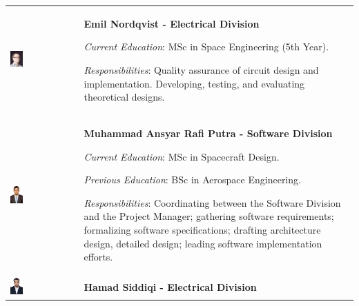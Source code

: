 \begin{longtable}[]{m{} m{}}
\includegraphics[width=0.2\textwidth]{1-introduction/img/emil-nordqvist.jpg} & \textbf{Emil Nordqvist - Electrical Division}

\smallskip
\textit{Current Education}: MSc in Space Engineering (5th Year).

\smallskip
\textit{Responsibilities}: Quality assurance of circuit design and implementation. Developing, testing, and evaluating theoretical designs.  \bigskip
\\

\includegraphics[width=0.2\textwidth]{1-introduction/img/muhammad-ansyar-rafi-putra.jpg} & \textbf{Muhammad Ansyar Rafi Putra - Software Division}

\smallskip
\textit{Current Education}: MSc in Spacecraft Design.

\smallskip
\textit{Previous Education}: BSc in Aerospace Engineering.


\smallskip 
\textit{Responsibilities}: Coordinating between the Software Division and the Project Manager; gathering software requirements; formalizing software specifications; drafting architecture design, detailed design; leading software implementation efforts.
\bigskip
\\

\includegraphics[width=0.2\textwidth]{1-introduction/img/hamad-saddiqi.jpg} & \textbf{Hamad Siddiqi - Electrical Division}



\end{longtable}

